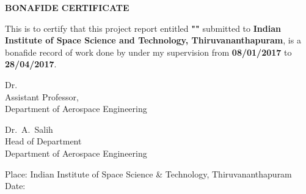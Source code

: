 \newpage
\titlepage{}
\begin{center}
  {\LARGE \textbf{\MakeUppercase{Bonafide Certificate}}\par}
\end{center}
\large
{\Large This is to certify that this project report entitled
  \textbf{"\MakeUppercase{\nidtitle{}}"} submitted to \textbf{Indian
    Institute of Space Science and Technology, Thiruvananthapuram}, is
  a bonafide record of work done by \textbf{\nidname{}} under
  my supervision from \textbf{08/01/2017} to \textbf{28/04/2017}. \par} 
\vfill{}
\begin{flushright}
  Dr.\ \nidguide{}\\
  Assistant Professor,\\
  Department of Aerospace Engineering\par
\end{flushright}
\vfill{}
\begin{center}
  Dr.\ A.\ Salih\\
  Head of Department\\
  Department of Aerospace Engineering\par
\end{center}
\vfill{}
Place: Indian Institute of Space Science \& Technology, Thiruvananthapuram\\
Date:

